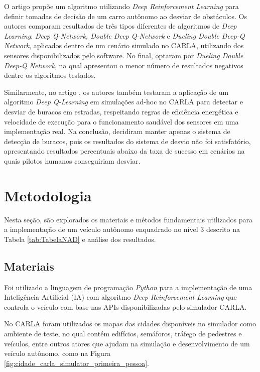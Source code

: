 \documentclass[a4paper,12pt,Times]{article}
\begin{document}
O artigo  propõe um algoritmo utilizando \textit{Deep Reinforcement Learning} para definir tomadas de decisão de um carro autônomo ao desviar de obstáculos. Os autores comparam resultados de três tipos diferentes de algoritmos de \textit{Deep Learning}: \textit{Deep Q-Network, Double Deep Q-Network} e \textit{Dueling Double Deep-Q Network}, aplicados dentro de um cenário simulado no CARLA, utilizando dos sensores disponibilizados pelo software. No final, optaram por \textit{Dueling Double Deep-Q Network}, na qual apresentou o menor número de resultados negativos dentre os algoritmos testados.

Similarmente, no artigo , os autores também testaram a aplicação de um algoritmo \textit{Deep Q-Learning} em simulações ad-hoc no CARLA para detectar e desviar de buracos em estradas, respeitando regras de eficiência energética e velocidade de execução para o funcionamento saudável dos sensores em uma implementação real. Na conclusão, decidiram manter apenas o sistema de detecção de buracos, pois os resultados do sistema de desvio não foi satisfatório, apresentando resultados percentuais abaixo da taxa de sucesso em cenários na quais pilotos humanos conseguiriam desviar.

\section{Metodologia}
Nesta seção, são explorados os materiais e métodos fundamentais utilizados para a implementação de um veículo autônomo enquadrado no nível 3 descrito na Tabela \ref{tab:TabelaNAD} e análise dos resultados.

\subsection{Materiais}

Foi utilizado a linguagem de programação \textit{Python} para a implementação de uma Inteligência Artificial (IA) com algoritmo \textit{Deep Reinforcement Learning} que controla o veículo com base nas APIs disponibilizadas pelo simulador CARLA.


No CARLA foram utilizados os mapas das cidades disponíveis no simulador como ambiente de teste, no qual contém edifícios, semáforos, tráfego  de pedestres e veículos, entre outros atores que ajudam na simulação e desenvolvimento de um veículo autônomo, como na Figura \ref{fig:cidade_carla_simulator_primeira_pessoa}.
\end{document}
